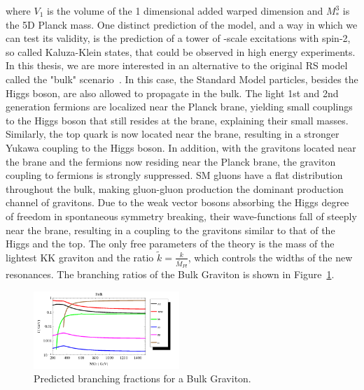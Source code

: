 where $V_1$ is the volume of the 1 dimensional added warped dimension and $M_*^3$ is the 5D Planck mass.
One distinct prediction of the model, and a way in which we can test its validity, is the prediction of a tower of \TeV-scale excitations with spin-2, so called Kaluza-Klein states, that could be observed in high energy experiments. \newline
In this thesis, we are more interested in an alternative to the original RS model called the "bulk" scenario~\cite{PhysRevD.76.036006,Fitzpatrick:2007qr}. In this case, the Standard Model particles, besides the Higgs boson, are also allowed to propagate in the bulk. The light 1st and 2nd generation fermions are localized near the Planck brane, yielding small couplings to the Higgs boson that still resides at the \TeV brane, explaining their small masses. Similarly, the top quark is now located near the \TeV brane, resulting in a stronger Yukawa coupling to the Higgs boson. In addition, with the gravitons located near the \TeV brane and the fermions now residing near the Planck brane, the graviton coupling to fermions is strongly suppressed. SM gluons have a flat distribution throughout the bulk, making gluon-gluon production the dominant production channel of gravitons. Due to the weak vector bosons absorbing the Higgs degree of freedom in spontaneous symmetry breaking, their wave-functions fall of steeply near the \TeV brane, resulting in a coupling to the gravitons similar to that of the Higgs and the top. The only free parameters of the theory is the mass of the lightest KK graviton and the ratio $\tilde{k} = \frac{k}{\bar{M}_{Pl}}$, which controls the widths of the new resonances. The branching ratios of the Bulk Graviton is shown in Figure~\ref{fig:theory:bulk}.

\begin{figure}[h!]
\centering
\includegraphics[width=0.49\textwidth]{figures/theory/BulkGravitonBR_tuomas.png}
\caption{Predicted branching fractions for a Bulk Graviton.}
\label{fig:theory:bulk}
\end{figure}

